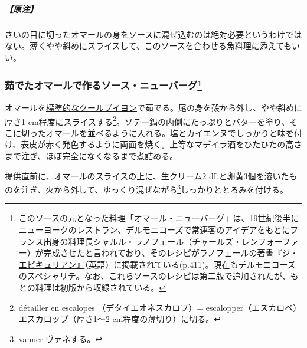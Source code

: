 \begin{recette}
\hypertarget{nota-sauce-new-burg-avec-le-homard-cru}{%
\subparagraph{【原注】}\label{nota-sauce-new-burg-avec-le-homard-cru}}

さいの目に切ったオマールの身をソースに混ぜ込むのは絶対必要というわけではない。薄くやや斜めにスライスして、このソースを合わせる魚料理に添えてもいい。

\hypertarget{sauce-new-burg-avec-le-homard-cuit}{%
\subsubsection[茹でたオマールで作るソース・ニューバーグ]{\texorpdfstring{茹でたオマールで作るソース・ニューバーグ\footnote{このソースの元となった料理「オマール・ニューバーグ」は、19世紀後半にニューヨークのレストラン、デルモニコーズで常連客のアイデアをもとにフランス出身の料理長シャルル・ラノフェール（チャールズ・レンフォーファー）が完成させたと言われており、そのレシピがラノフェールの著書\href{https://archive.org/details/epicureancomplet00ranhrich}{『ジ・エピキュリアン』}（英語）に掲載されている(p.411)。現在もデルモニコーズのスペシャリテ。なお、これらソースのレシピは第二版で追加されたが、もとの料理は初版から収録されている。}}{茹でたオマールで作るソース・ニューバーグ}}\label{sauce-new-burg-avec-le-homard-cuit}}



オマールを\protect\hyperlink{court-bouillon-e}{標準的なクールブイヨン}で茹でる。尾の身を殻から外し、やや斜めに厚さ1
cm程度にスライスする\footnote{détailler en escalopes
  （デタイエオネスカロプ）= escalopper（エスカロペ）
  エスカロップ（厚さ1〜2 cm程度の薄切り）に切る。}。ソテー鍋の内側にたっぷりとバターを塗り、そこに切ったオマールを並べるように入れる。塩とカイエンヌでしっかりと味を付け、表皮が赤く発色するように両面を焼く。上等なマデイラ酒をひたひたの高さまで注ぎ、ほぼ完全になくなるまで煮詰める。

提供直前に、オマールのスライスの上に、生クリーム2
dLと卵黄3個を溶いたものを注ぎ、火から外して、ゆっくり混ぜながら\footnote{vanner
  ヴァネする。}しっかりととろみを付ける。


\end{recette}
